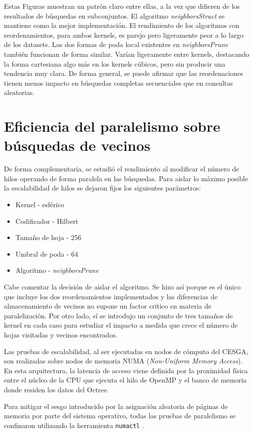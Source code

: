 Estas Figuras muestran un patrón claro entre ellas, a la vez que difieren de los resultados de búsquedas en subconjuntos. El algoritmo \textit{neighborsStruct} se mantiene como la mejor implementación. El rendimiento de los algoritmos con reordenamientos, para ambos kernels, es parejo pero ligeramente peor a lo largo de los datasets. Las dos formas de poda local existentes en \textit{neighborsPrune} también funcionan de forma similar. Varían ligeramente entre kernels, destacando la forma cartesiana algo más en los kernels cúbicos, pero sin producir una tendencia muy clara. De forma general, se puede afirmar que las reordenaciones tienen menos impacto en búsquedas completas secuenciales que en consultas aleatorias.

\section{Eficiencia del paralelismo sobre búsquedas de vecinos}
De forma complementaria, se estudió el rendimiento al modificar el número de hilos operando de forma paralela en las búsquedas. Para aislar lo máximo posible la escalabilidad de hilos se dejaron fijos los siguientes parámetros:
\begin{itemize}
    \item Kernel - esférico
    \item Codificador - Hilbert
    \item Tamaño de hoja - 256
    \item Umbral de poda - 64
    \item Algoritmo - \textit{neighborsPrune}
\end{itemize}

Cabe comentar la decisión de aislar el algoritmo. Se hizo así porque es el único que incluye los dos reordenamientos implementados y las diferencias de almacenamiento de vecinos no supone un factor crítico en materia de paralelización. Por otro lado, sí se introdujo un conjunto de tres tamaños de kernel en cada caso para estudiar el impacto a medida que crece el número de hojas visitadas y vecinos encontrados.

Las pruebas de escalabilidad, al ser ejecutadas en nodos de cómputo del CESGA, son realizadas sobre nodos de memoria NUMA (\textit{Non-Uniform Memory Access}). En esta arquitectura, la latencia de acceso viene definida por la proximidad física entre el núcleo de la CPU que ejecuta el hilo de OpenMP y el banco de memoria donde residen los datos del Octree.

Para mitigar el sesgo introducido por la asignación aleatoria de páginas de memoria por parte del sistema operativo, todas las pruebas de paralelismo se confinaron utilizando la herramienta \texttt{numactl} \cite{man_numactl}.

